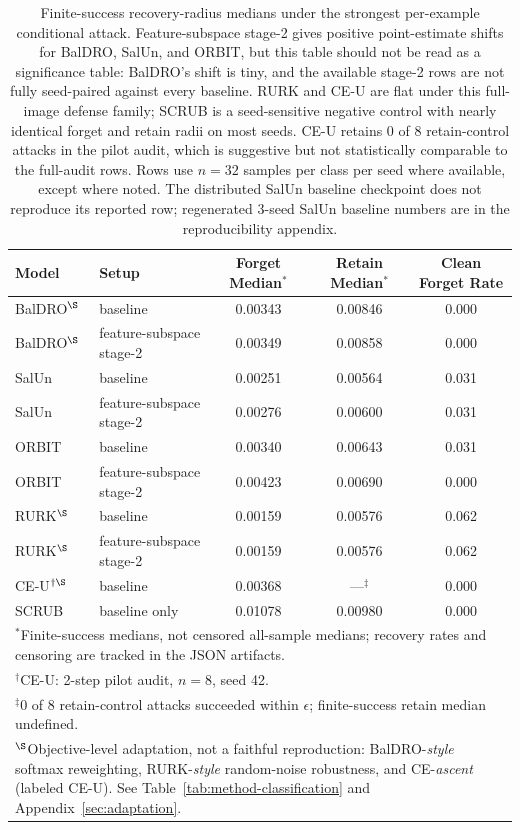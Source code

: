 \begin{table}[t]
  \centering
  \small
  \setlength{\tabcolsep}{3pt}
  \begin{tabular}{l l c c c}
    \toprule
    Model & Setup & Forget Median$^\ast$ & Retain Median$^\ast$ & Clean Forget Rate \\
    \midrule
    BalDRO$^\S$ & baseline & 0.00343 & 0.00846 & 0.000 \\
    BalDRO$^\S$ & feature-subspace stage-2 & 0.00349 & 0.00858 & 0.000 \\
    SalUn & baseline & 0.00251 & 0.00564 & 0.031 \\
    SalUn & feature-subspace stage-2 & 0.00276 & 0.00600 & 0.031 \\
    ORBIT & baseline & 0.00340 & 0.00643 & 0.031 \\
    ORBIT & feature-subspace stage-2 & 0.00423 & 0.00690 & 0.000 \\
    RURK$^\S$ & baseline & 0.00159 & 0.00576 & 0.062 \\
    RURK$^\S$ & feature-subspace stage-2 & 0.00159 & 0.00576 & 0.062 \\
    CE-U$^{\dagger\S}$ & baseline & 0.00368 & ---$^\ddagger$ & 0.000 \\
    SCRUB & baseline only & 0.01078 & 0.00980 & 0.000 \\
    \bottomrule
    \multicolumn{5}{p{0.92\linewidth}}{\footnotesize $^\ast$Finite-success medians, not censored all-sample medians; recovery rates and censoring are tracked in the JSON artifacts.}\\
    \multicolumn{5}{p{0.92\linewidth}}{\footnotesize $^\dagger$CE-U: 2-step pilot audit, $n{=}8$, seed 42.}\\
    \multicolumn{5}{p{0.92\linewidth}}{\footnotesize $^\ddagger$0 of 8 retain-control attacks succeeded within $\epsilon$; finite-success retain median undefined.}\\
    \multicolumn{5}{p{0.92\linewidth}}{\footnotesize $^\S$Objective-level adaptation, not a faithful reproduction: BalDRO-\emph{style} softmax reweighting, RURK-\emph{style} random-noise robustness, and CE-\emph{ascent} (labeled CE-U). See Table~\ref{tab:method-classification} and Appendix~\ref{sec:adaptation}.}\\
  \end{tabular}
  \caption{Finite-success recovery-radius medians under the strongest per-example conditional attack. Feature-subspace stage-2 gives positive point-estimate shifts for BalDRO, SalUn, and ORBIT, but this table should not be read as a significance table: BalDRO's shift is tiny, and the available stage-2 rows are not fully seed-paired against every baseline. RURK and CE-U are flat under this full-image defense family; SCRUB is a seed-sensitive negative control with nearly identical forget and retain radii on most seeds. CE-U retains 0 of 8 retain-control attacks in the pilot audit, which is suggestive but not statistically comparable to the full-audit rows. Rows use $n=32$ samples per class per seed where available, except where noted. The distributed SalUn baseline checkpoint does not reproduce its reported row; regenerated 3-seed SalUn baseline numbers are in the reproducibility appendix.}
  \label{tab:subspace-defense}
\end{table}

